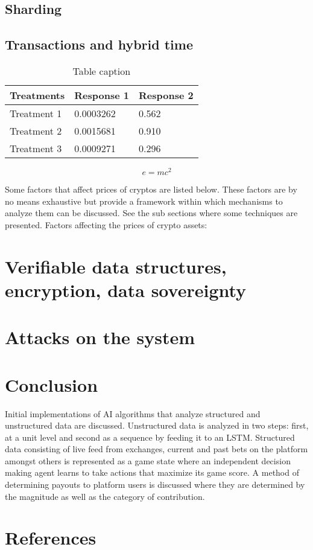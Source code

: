 \documentclass[preprint,12pt]{elsarticle}
\begin{document}
\subsection{Sharding}
\subsection{Transactions and hybrid time}

\begin{table}[h]
\centering
\begin{tabular}{l l l}
\hline
\textbf{Treatments} & \textbf{Response 1} & \textbf{Response 2}\\
\hline
Treatment 1 & 0.0003262 & 0.562 \\
Treatment 2 & 0.0015681 & 0.910 \\
Treatment 3 & 0.0009271 & 0.296 \\
\hline
\end{tabular}
\caption{Table caption}
\end{table}


\begin{equation}
\label{eq:emc}
e = mc^2
\end{equation}

Some factors that affect prices of cryptos are listed below. These factors are by no means exhaustive but provide a
framework within which mechanisms to analyze them can be discussed. See the sub sections where some techniques are
presented. \cite{Picolo_Whitepaper}
Factors affecting the prices of crypto assets:

\section{Verifiable data structures, encryption, data sovereignty}

\section{Attacks on the system}


\section{Conclusion}
Initial implementations of AI algorithms that analyze structured and unstructured data are discussed. Unstructured data is analyzed in two steps: first, at a unit level and second as a sequence by feeding it to an LSTM. Structured data consisting of live feed from exchanges, current and past bets on the platform amongst others is represented as a game state where an independent decision making agent learns to take actions that maximize its game score. A method of determining payouts to platform users is discussed where they are determined by the magnitude as well as the category of contribution.


\section{References}

\end{document}
